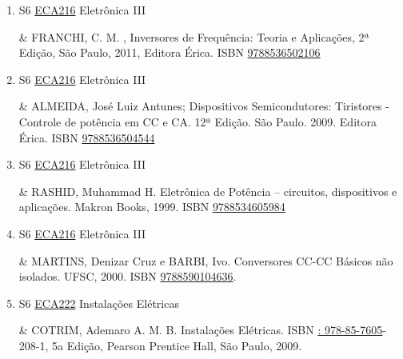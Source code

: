 \documentclass[12pt,a4paper]{book}
\begin{document}
\begin{enumerate}
& AHMED, A. , Eletrônica de Potência, São Paulo, 2006, Editora Pearson Prentice Hall.  ISBN \href{http://www.bn.br/site/pages/servicosProfissionais/agenciaISBN/isbnBusca/FbnBuscaISBNCatalogo.asp?pField=ISBN&pIntPagina=1&pISBN=87918031&nidbISBN=true&hidbISBN=true}{9788587918031}
 

 \item S6 \hyperref[PUD:ECA216]{ECA216} Eletrônica III

& FRANCHI, C.  M. , Inversores de Frequência: Teoria e Aplicações, 2ª Edição, São Paulo, 2011, Editora Érica.  ISBN \href{http://www.bn.br/site/pages/servicosProfissionais/agenciaISBN/isbnBusca/FbnBuscaISBNCatalogo.asp?pField=ISBN&pIntPagina=1&pISBN=36502106&nidbISBN=true&hidbISBN=true}{9788536502106}
 

 \item S6 \hyperref[PUD:ECA216]{ECA216} Eletrônica III

& ALMEIDA, José Luiz Antunes;  Dispositivos Semicondutores: Tiristores - Controle de potência em CC e CA.  12ª Edição.  São Paulo.  2009.  Editora Érica.  ISBN \href{http://www.bn.br/site/pages/servicosProfissionais/agenciaISBN/isbnBusca/FbnBuscaISBNCatalogo.asp?pField=ISBN&pIntPagina=1&pISBN=36504544&nidbISBN=true&hidbISBN=true}{9788536504544}
 

 \item S6 \hyperref[PUD:ECA216]{ECA216} Eletrônica III

&  RASHID, Muhammad H.  Eletrônica de Potência – circuitos, dispositivos e aplicações.  Makron Books, 1999.  ISBN \href{http://www.bn.br/site/pages/servicosProfissionais/agenciaISBN/isbnBusca/FbnBuscaISBNCatalogo.asp?pField=ISBN&pIntPagina=1&pISBN=34605984&nidbISBN=true&hidbISBN=true}{9788534605984}
 

 \item S6 \hyperref[PUD:ECA216]{ECA216} Eletrônica III

&  MARTINS, Denizar Cruz e BARBI, Ivo.  Conversores CC-CC Básicos não isolados.  UFSC, 2000.  ISBN \href{http://www.bn.br/site/pages/servicosProfissionais/agenciaISBN/isbnBusca/FbnBuscaISBNCatalogo.asp?pField=ISBN&pIntPagina=1&pISBN=90104636&nidbISBN=true&hidbISBN=true}{9788590104636}.
 \item S6 \hyperref[PUD:ECA222]{ECA222} Instalações Elétricas

& COTRIM, Ademaro A. M. B.  Instalações Elétricas.  ISBN \href{http://www.google.com/search?hl=pt-BR&tbo=p&tbm=bks&q=isbn:: 978-85-7605&num=10}{: 978-85-7605}-208-1, 5a Edição, Pearson Prentice Hall, São Paulo, 2009. 
 


\end{enumerate}
\end{document}
